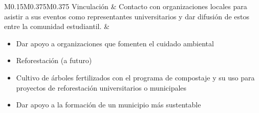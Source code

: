 \begin{table}[H]
{\begin{tabular}{M{0.15\linewidth}M{0.375\linewidth}M{0.375\linewidth}}
    Vinculación & Contacto con organizaciones locales para asistir a sus eventos como representantes universitarios y dar difusión de estos entre la comunidad estudiantil.
    &
    \begin{itemize}
        \item Dar apoyo a organizaciones que fomenten el cuidado ambiental
        \item Reforestación (a futuro)
        \item Cultivo de árboles fertilizados con el programa de compostaje y su uso para proyectos de reforestación universitarios o municipales
        \item Dar apoyo a la formación de un municipio más sustentable
    \end{itemize} \\

    \hline
\end{tabular}}
\end{table}